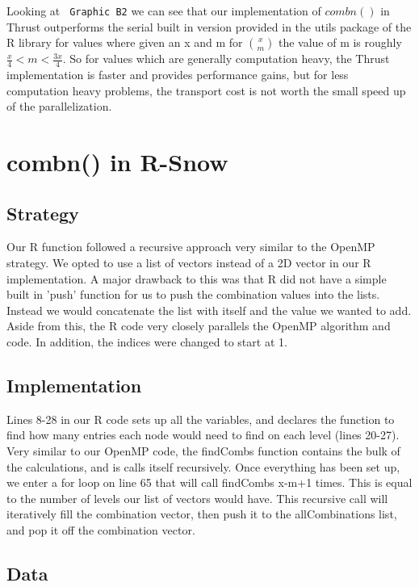 \documentclass[titlepage, 11pt]{article}
\begin{document}
Looking at \verb; Graphic B2; we can see that our implementation of $combn()$ in Thrust outperforms the serial built in version provided in the utils package of the R library for values where given an x and m for ${x \choose m}$ the value of m is roughly $\frac{x}{4} < m < \frac{3x}{4}$. So for values which are generally computation heavy, the Thrust implementation is faster and provides performance gains, but for less computation heavy problems, the transport cost is not worth the small speed up of the parallelization.

\section{combn() in R-Snow}

\subsection{Strategy}
Our R function followed a recursive approach very similar to the OpenMP strategy. We opted to use a list of vectors instead of a 2D vector in our R implementation. A major drawback to this was that R did not have a simple built in 'push' function for us to push the combination values into the lists. Instead we would concatenate the list with itself and the value we wanted to add. Aside from this, the R code very closely parallels the OpenMP algorithm and code. In addition, the indices were changed to start at 1.

\subsection{Implementation}
Lines 8-28 in our R code sets up all the variables, and declares the function to find how many entries each node would need to find on each level (lines 20-27). Very similar to our OpenMP code, the findCombs function contains the bulk of the calculations, and is calls itself recursively. Once everything has been set up, we enter a for loop on line 65 that will call findCombs x-m+1 times. This is equal to the number of levels our list of vectors would have. This recursive call will iteratively fill the combination vector, then push it to the allCombinations list, and pop it off the combination vector.

\subsection{Data}
\end{document}
